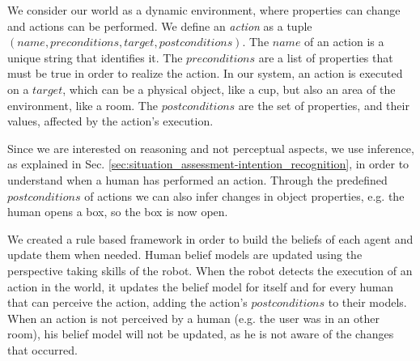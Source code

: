 We consider our world as a dynamic environment, where properties can change and actions can be performed.  We define an \textit{action} as a tuple $(name, preconditions, target, postconditions)$. The $name$ of an action is a unique string that identifies it. The $preconditions$ are a list of properties that must be true in order to realize the action. In our system, an action is executed on a $target$, which can be a physical object, like a cup, but also an area of the environment, like a room. The $postconditions$ are the set of properties, and their values, affected by the action's execution.

Since we are interested on reasoning and not perceptual aspects, we use inference, as explained in Sec. \ref{sec:situation_assessment-intention_recognition}, in order to understand when a human has performed an action. Through the predefined $postconditions$ of actions we can also infer changes in object properties, e.g. the human opens a box, so the box is now open. 

We created a rule based framework in order to build the beliefs of each agent and update them when needed. Human belief models are updated using the perspective taking skills of the robot. When the robot detects the execution of an action in the world, it updates the belief model for itself and for every human that can perceive the action, adding the action's $postconditions$ to their models. When an action is not perceived by a human (e.g. the user was in an other room), his belief model will not be updated, as he is not aware of the changes that occurred.

